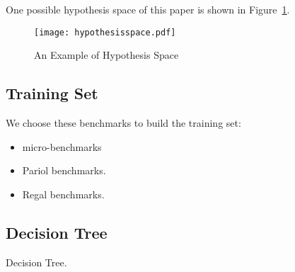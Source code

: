 

One possible hypothesis space of this paper is shown in Figure~\ref{fig:hs}.

\begin{figure}[!t]
\centering
\texttt{[image: hypothesisspace.pdf]}
\caption{An Example of Hypothesis Space}
\label{fig:hs}
\end{figure}

\subsection{Training Set}

We choose these benchmarks to build the training set:

\begin{itemize}

\item micro-benchmarks

\item Pariol benchmarks.

\item Regal benchmarks.

\end{itemize}

\subsection{Decision Tree}
\label{subsec:decisiontree}

Decision Tree.

